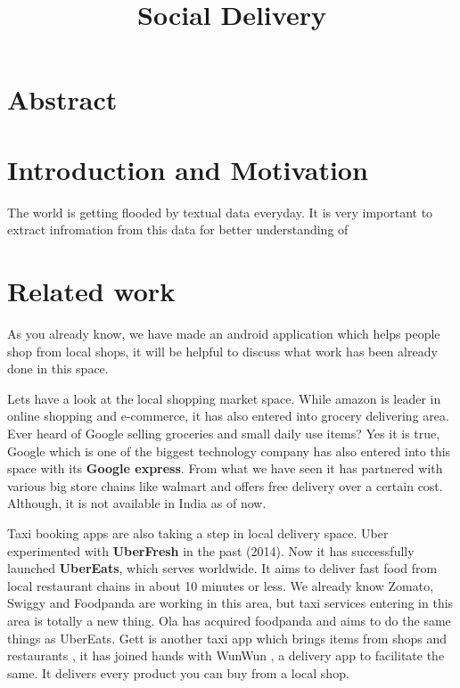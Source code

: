 \documentclass{report}
\begin{document}
\title{\Huge  Social Delivery\linebreak}
\date{}
\maketitle
\setlength{\columnsep}{0.7cm}
\chapter{Abstract}
\par \Large \textit { }


\chapter{Introduction and Motivation}

\par \Large The world is getting flooded by textual data everyday. It is very important to extract infromation from this data for better understanding of


\chapter{Related work}
\par As you already know,  we have made an android application which helps people shop from local shops, it will be helpful to discuss what work has been already done in this space.

\par Let\textquotesingle s have a look at the local shopping market space. While amazon is leader in online shopping and e-commerce, it has also entered into grocery delivering area. Ever heard of Google selling groceries and small daily use items? Yes it is true, Google which is one of the biggest technology company has also entered into this space with its
\textbf{Google express}. From what we have seen it has partnered  with various big store chains like walmart and offers free delivery over a certain cost. Although, it is not available in India as of now.

\par Taxi booking apps are also taking a step in local delivery space. Uber experimented with \textbf{UberFresh} in the past (2014). Now it has successfully launched \textbf{UberEats}, which serves worldwide.  It aims to deliver fast food from local restaurant chains in about 10 minutes or less. We already know Zomato, Swiggy and Foodpanda are working in this area, but taxi services entering in this area is totally a new thing. Ola has acquired foodpanda and aims to do the same things as UberEats.
Gett is another taxi app which brings items from shops and restaurants , it has joined hands with WunWun , a delivery app to facilitate the same. It delivers every product you can buy from a local shop. 
\end{document}
